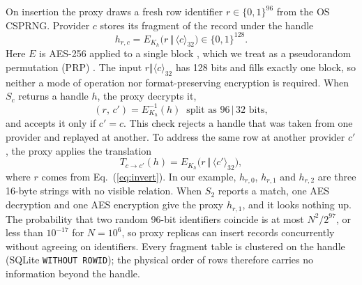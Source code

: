 \documentclass[conference]{IEEEtran}
\begin{document}
On insertion the proxy draws a fresh row identifier $r\in\{0,1\}^{96}$ from the OS CSPRNG. Provider $c$ stores its fragment of the record under the handle
\begin{equation}
  h_{r,c} = E_{K_h}\big(r \,\Vert\, \langle c\rangle_{32}\big) \in \{0,1\}^{128}.
  \label{eq:handle}
\end{equation}
Here $E$ is AES-256 applied to a single block \cite{fips197}, which we treat as a pseudorandom permutation (PRP) \cite{luby1988prp}. The input $r\Vert\langle c\rangle_{32}$ has 128 bits and fills exactly one block, so neither a mode of operation nor format-preserving encryption is required. When $S_c$ returns a handle $h$, the proxy decrypts it,
\begin{equation}
  (r,\,c') = E^{-1}_{K_h}(h)\ \text{ split as } 96\,|\,32 \text{ bits},
  \label{eq:invert}
\end{equation}
and accepts it only if $c'=c$. This check rejects a handle that was taken from one provider and replayed at another. To address the same row at another provider $c'$, the proxy applies the translation
\begin{equation}
  T_{c\to c'}(h) = E_{K_h}\big(r \,\Vert\, \langle c'\rangle_{32}\big),
  \label{eq:translate}
\end{equation}
where $r$ comes from Eq.~(\ref{eq:invert}). In our example, $h_{r,0}$, $h_{r,1}$ and $h_{r,2}$ are three 16-byte strings with no visible relation. When $S_2$ reports a match, one AES decryption and one AES encryption give the proxy $h_{r,1}$, and it looks nothing up. The probability that two random 96-bit identifiers coincide is at most $N^2/2^{97}$, or less than $10^{-17}$ for $N=10^6$, so proxy replicas can insert records concurrently without agreeing on identifiers. Every fragment table is clustered on the handle (SQLite \texttt{WITHOUT ROWID}); the physical order of rows therefore carries no information beyond the handle.
\end{document}
